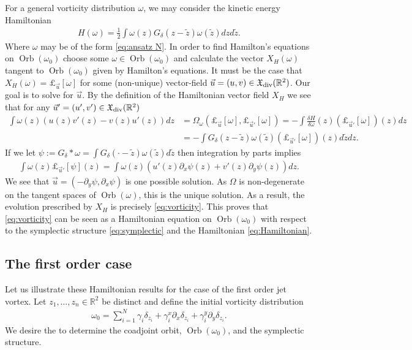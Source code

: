 \documentclass[12pt]{amsart}
\newcommand{\R}{\ensuremath{\mathbb{R}}}
\theoremstyle{remark}
\DeclareMathOperator{\Orb}{Orb}
\begin{document}
For a general vorticity distribution $\omega$, we may consider the kinetic energy Hamiltonian
\begin{align}
  H(\omega) = \frac{1}{2} \int \omega(z) G_\delta(z-\tilde{z}) \omega(\tilde{z}) dz d\tilde{z}. \label{eq:Hamiltonian}
\end{align}
Where $\omega$ may be of the form \eqref{eq:ansatz N}.
  In order to find Hamilton's equations on $\Orb(\omega_0)$ choose some $\omega \in \Orb(\omega_0)$ and calculate the vector $X_H(\omega)$ tangent to $\Orb(\omega_0)$
  given by Hamilton's equations.
  It must be the case that $X_H(\omega) =  \pounds_{\vec{u}}[\omega]$ for some (non-unique) vector-field $\vec{u} = (u,v) \in \mathfrak{X}_{\rm div}(\R^2)$.
  Our goal is to solve for $\vec{u}$.
  By the definition of the Hamiltonian vector field $X_H$ we see that for any
  $\vec{u}' = (u',v') \in \mathfrak{X}_{\rm div}(\R^2)$
  \begin{align*}
    \int \omega(z) \left( u(z) v'(z)  - v(z) u'(z) \right) dz &=
    \Omega_{\omega}( \pounds_{\vec{u}}[\omega] , \pounds_{\vec{u}'}[\omega] ) = - \int \frac{\delta H}{\delta \omega} (z) \left( \pounds_{\vec{u}'}[\omega] \right)(z) dz  \\
    &= - \int G_\delta(z-\tilde{z}) \omega (\tilde{z}) \left( \pounds_{\vec{u}'}[\omega] \right)(z) d\tilde{z} dz .
  \end{align*}
  If we let $\psi := G_\delta*\omega = \int G_\delta(\cdot -\tilde{z}) \omega (\tilde{z}) d \tilde{z}$ then integration by parts implies
  \begin{align*}
     \int \omega(z) \pounds_{\vec{u}'}[\psi](z) 
    =  \int \omega(z)  \left( u'(z) \partial_x \psi (z)+ v'(z) \partial_y \psi(z) \right) dz.
  \end{align*}
  We see that $\vec{u} = (-\partial_y \psi,\partial_x \psi)$ is one possible solution.
  As $\Omega$ is non-degenerate on the tangent spaces of $\Orb(\omega)$, this is the unique solution.
  As a result, the evolution prescribed by $X_H$ is precisely \eqref{eq:vorticity}.
  This proves that \eqref{eq:vorticity} can be seen as a Hamiltonian equation on $\Orb(\omega_0)$ with respect to the symplectic structure \eqref{eq:symplectic} and the Hamiltonian \eqref{eq:Hamiltonian}.

\subsection{The first order case}
Let us illustrate these Hamiltonian results for the case of the first order jet vortex.
Let $z_1,\dots,z_n \in \R^2$ be distinct
and define the initial vorticity distribution
\begin{align*}
  \omega_0 = \sum_{i=1}^N \gamma_i \delta_{z_i} + \gamma_i^x \partial_x \delta_{z_i} + \gamma_i^y \partial_{y} \delta_{z_i}.
\end{align*}
We desire the to determine the coadjoint orbit, $\Orb(\omega_0)$, and the symplectic structure.
\end{document}
